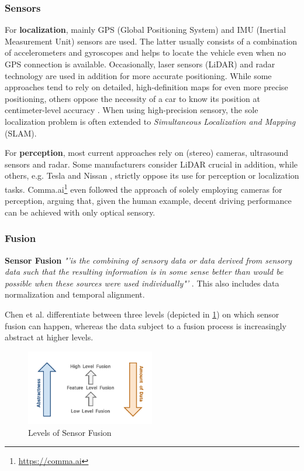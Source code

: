 \subsubsection{Sensors}
For \textbf{localization}, mainly GPS (Global Positioning System) and IMU (Inertial Measurement Unit) sensors are used. The latter usually consists of a combination of accelerometers and gyroscopes and helps to locate the vehicle even when no GPS connection is available. Occasionally, laser sensors (LiDAR) and radar technology are used in addition for more accurate positioning. While some approaches tend to rely on detailed, high-definition maps for even more precise positioning, others oppose the necessity of a car to know its position at centimeter-level accuracy \cite{Friedman2019}. When using high-precision sensory, the sole localization problem is often extended to \textit{Simultaneous Localization and Mapping} (SLAM).

For \textbf{perception}, most current approaches rely on (stereo) cameras, ultrasound sensors and radar. Some manufacturers consider LiDAR crucial in addition, while others, e.g. Tesla and Nissan \cite{McKinseyCenterforFutureMobility2019}, strictly oppose its use for perception or localization tasks. Comma.ai\footnote{\url{https://comma.ai}} even followed the approach of solely employing cameras for perception, arguing that, given the human example, decent driving performance can be achieved with only optical sensory. 

\subsubsection{Fusion}
\textbf{Sensor Fusion} \textit{"'is the combining of sensory data or data derived from sensory data such that the resulting information is in some sense better than would be possible when these sources were used individually"'} \cite{Elmenreich2002}. This also includes data normalization and temporal alignment.

Chen et al. \cite{Chen2019} differentiate between three levels (depicted in \cref{fig:fusion_levels}) on which sensor fusion can happen, whereas the data subject to a fusion process is increasingly abstract at higher levels. 

\begin{figure}[H]
	\centering
	\includegraphics[width=0.5\textwidth]{98_images/fusion_levels}
	\caption{Levels of Sensor Fusion}
	\label{fig:fusion_levels}
\end{figure}

